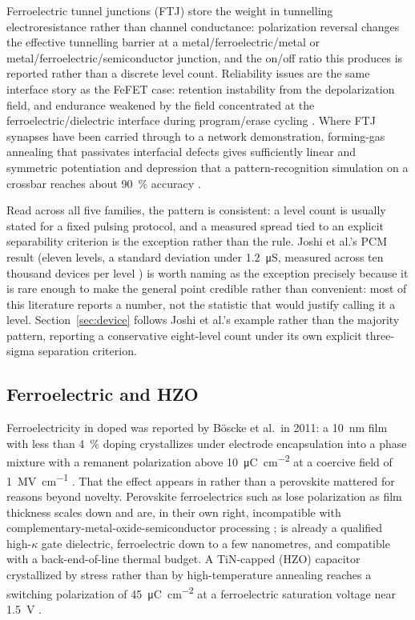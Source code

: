 Ferroelectric tunnel junctions (FTJ) store the weight in tunnelling electroresistance
rather than channel conductance: polarization reversal changes the effective tunnelling
barrier at a metal/ferroelectric/metal or metal/ferroelectric/semiconductor junction, and
the on/off ratio this produces is reported rather than a discrete level count.
Reliability issues are the same interface story as the FeFET case: retention instability
from the depolarization field, and endurance weakened by the field concentrated at the
ferroelectric/dielectric interface during program/erase cycling
\cite{You2026_AdvSci}. Where FTJ synapses have been carried through to a network
demonstration, forming-gas annealing that passivates interfacial defects gives
sufficiently linear and symmetric potentiation and depression that a pattern-recognition
simulation on a  crossbar reaches about \SI{90}{\percent} accuracy
\cite{Nguyen2025_NanoConverg}.

Read across all five families, the pattern is consistent: a level count is usually stated
for a fixed pulsing protocol, and a measured spread tied to an explicit separability
criterion is the exception rather than the rule. Joshi et al.'s PCM result (eleven
levels, a standard deviation under \SI{1.2}{\micro\siemens}, measured across ten thousand
devices per level \cite{Joshi2020_NatComm}) is worth naming as the exception precisely
because it is rare enough to make the general point credible rather than convenient: most
of this literature reports a number, not the statistic that would justify calling it a
level. Section~\ref{sec:device} follows Joshi et al.'s example rather than the majority
pattern, reporting a conservative eight-level count under its own explicit three-sigma
separation criterion.

\subsection{Ferroelectric  and HZO}

Ferroelectricity in doped  was reported by B\"oscke et al.\ in 2011: a
\SI{10}{\nano\metre} film with less than \SI{4}{\percent}  doping crystallizes
under electrode encapsulation into a phase mixture with a remanent polarization above
\SI{10}{\micro\coulomb\per\square\centi\metre} at a coercive field of
\SI{1}{\mega\volt\per\centi\metre} \cite{Boescke2011_APL}. That the effect appears in
 rather than a perovskite mattered for reasons beyond novelty. Perovskite
ferroelectrics such as  lose polarization as film thickness scales down and
are, in their own right, incompatible with complementary-metal-oxide-semiconductor
processing \cite{Liao2023_FundamentalResearch};  is already a qualified
high-$\kappa$ gate dielectric, ferroelectric down to a few nanometres, and compatible with
a back-end-of-line thermal budget. A TiN-capped  (HZO) capacitor
crystallized by stress rather than by high-temperature annealing reaches a switching
polarization of \SI{45}{\micro\coulomb\per\square\centi\metre} at a ferroelectric
saturation voltage near \SI{1.5}{\volt} \cite{Kim2017_APL}.

